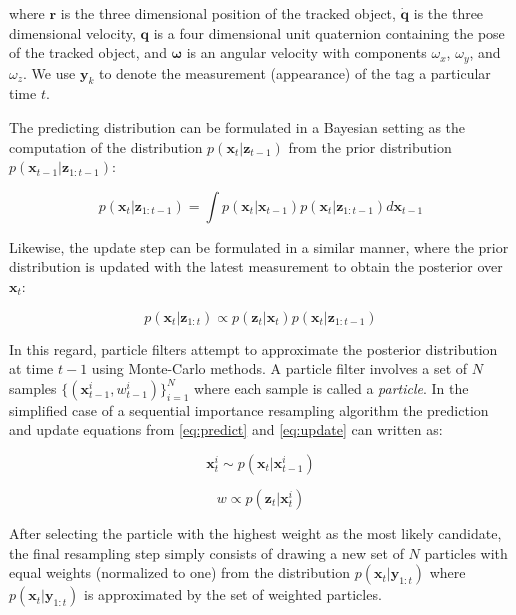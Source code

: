 \documentclass[letterpaper, 10 pt, conference]{ieeeconf}
\renewcommand{\vec}[1]{\boldsymbol{#1}}
\begin{document}
where $\vec{r}$ is the three dimensional position of the tracked object, $\dot{\vec{q}}$ is the three dimensional velocity, $\vec{q}$ is a four dimensional unit quaternion containing the pose of the tracked object, and $\vec{\omega}$ is an angular velocity with components $\omega_x$, $\omega_y$, and $\omega_z$. We use $\vec{y}_k$ to denote the measurement (appearance) of the tag a particular time $t$. 

The predicting distribution can be formulated in a Bayesian setting as the computation of the distribution $p(\vec{x}_t|\vec{z}_{t-1})$ from the prior distribution $p(\vec{x}_{t-1}|\vec{z}_{1:t-1})$:

\begin{equation} \label{eq:predict}
p(\vec{x}_t|\vec{z}_{1:t-1}) = \int p(\vec{x}_t | \vec{x}_{t-1})p(\vec{x}_t|\vec{z}_{1:t-1})d\vec{x}_{t-1}
\end{equation}

Likewise, the update step can be formulated in a similar manner, where the prior distribution is updated with the latest measurement to obtain the posterior over $\vec{x}_t$:

\begin{equation} \label{eq:update}
p(\vec{x}_t|\vec{z}_{1:t}) \propto p(\vec{z}_t|\vec{x}_t)p(\vec{x}_t|\vec{z}_{1:t-1})
\end{equation}

In this regard, particle filters attempt to approximate the posterior distribution at time $t-1$ using Monte-Carlo methods. A particle filter involves a set of $N$ samples $\{ (\vec{x}^i_{t-1}, w^i_{t-1}) \}_{i=1}^N$ where each sample is called a \emph{particle}. In the simplified case of a sequential importance resampling algorithm the prediction and update equations from \ref{eq:predict} and \ref{eq:update} can written as:

\begin{equation}
	\vec{x}^i_t \sim p(\vec{x}_t|\vec{x}^i_{t-1})
\end{equation}

\begin{equation}
	w \propto p(\vec{z}_t|\vec{x}^i_t)
\end{equation}

After selecting the particle with the highest weight as the most likely candidate, the final resampling step simply consists of drawing a new set of $N$ particles with equal weights (normalized to one) from the distribution $p(\vec{x}_t|\vec{y}_{1:t})$ where $p(\vec{x}_t|\vec{y}_{1:t})$ is approximated by the set of weighted particles.
\end{document}
